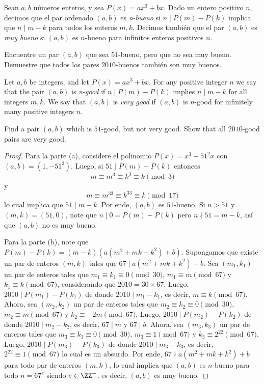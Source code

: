 \begin{probMG}
	Sean $a,b$ números enteros, y sea $P(x)=ax^3+bx$. Dado un entero positivo $n$, decimos que el par ordenado $(a,b)$ es \emph{n-bueno} si $n\mid P(m)-P(k)$ implica que $n\mid m-k$ para todos los enteros $m,k$. Decimos también que el par $(a,b)$ es \emph{muy bueno} si $(a,b)$ es $n$-bueno para infinitos enteros positivos $n$.
	\begin{enumerate}[(a)]
		\ii Encuentre un par $(a,b)$ que sea $51$-bueno, pero que no sea muy bueno.
		\ii Demuestre que todos los pares $2010$-buenos también son muy buenos.
	\end{enumerate}
	\begin{hint}
		Let $a,b$ be integers, and let $P(x)=ax^3+bx$. For any positive integer $n$ we say that the pair $(a,b)$ is \emph{n-good} if $n\mid P(m)-P(k)$ implies $n\mid m-k$ for all integers $m,k$. We say that $(a,b)$ is \emph{very good} if $(a,b)$ is $n$-good for infinitely many positive integers $n$.
		\begin{enumerate}[(a)]
			\ii Find a pair $(a,b)$ which is $51$-good, but not very good.
			\ii Show that all $2010$-good pairs are very good.
		\end{enumerate}
	\end{hint}
\end{probMG}

\begin{proof}
	Para la parte (a), considere el polinomio $P(x)=x^3-51^2x$ con $(a,b)=(1,-51^2)$. Luego, si $51\mid P(m)-P(k)$ entonces
	\[m\equiv m^3\equiv k^3\equiv k\pmod 3\]
	y
	\[m\equiv m^{33}\equiv k^{33}\equiv k\pmod 17\]
	lo cual implica que $51\mid m-k$. Por ende, $(a,b)$ es $51$-bueno. Si $n>51$ y $(m,k)=(51,0)$, note que $n\mid 0=P(m)-P(k)$ pero $n\nmid 51=m-k$, así que $(a,b)$ no es muy bueno.

	Para la parte (b), note que $P(m)-P(k)=(m-k)(a(m^2+mk+k^2)+b)$. Supongamos que existe un par de enteros $(m,k)$ tales que $67\mid a(m^2+mk+k^2)+b$. Sea $(m_1,k_1)$ un par de enteros tales que $m_1\equiv k_1\equiv 0\pmod 30$, $m_1\equiv m\pmod{67}$ y $k_1\equiv k\pmod{67}$, considerando que $2010=30\times 67$. Luego, $2010\mid P(m_1)-P(k_1)$ de donde $2010\mid m_1-k_1$, es decir, $m\equiv k\pmod{67}$. Ahora, sea $(m_2,k_2)$ un par de enteros tales que $m_2\equiv k_2\equiv 0\pmod 30$, $m_2\equiv m\pmod{67}$ y $k_2\equiv -2m\pmod{67}$. Luego, $2010\mid P(m_2)-P(k_2)$ de donde $2010\mid m_2-k_2$, es decir, $67\mid m$ y $67\mid b$. Ahora, sea $(m_3,k_3)$ un par de enteros tales que $m_3\equiv k_3\equiv 0\pmod 30$, $m_3\equiv 1\pmod{67}$ y $k_3\equiv 2^{22}\pmod{67}$. Luego, $2010\mid P(m_3)-P(k_3)$ de donde $2010\mid m_3-k_3$, es decir, $2^{22}\equiv 1\pmod{67}$ lo cual es un absurdo. Por ende, $67\nmid a(m^2+mk+k^2)+b$ para todo par de enteros $(m,k)$, lo cual implica que $(a,b)$ es $n$-bueno para todo $n=67^e$ siendo $e\in\ZZ^+$, es decir, $(a,b)$ es muy bueno.
\end{proof}

